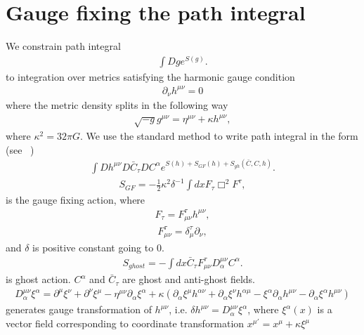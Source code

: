\documentclass[aps,preprintnumbers,superscriptaddress,longbibliography]{revtex4-1}
\begin{document}
\section{Gauge fixing the path integral}
\label{sec:gauge}
We constrain path integral
\begin{eqnarray}
\int{Dg e^{S(g)}}.
\end{eqnarray}
to integration over metrics satisfying the harmonic gauge condition
\begin{eqnarray}
\partial_{\nu}h^{\mu \nu}=0
\end{eqnarray}
where the metric density splits in the following way
\begin{eqnarray}
\sqrt{-g}g^{\mu \nu}=\eta^{\mu \nu}+\kappa h^{\mu \nu},
\end{eqnarray}
where $\kappa^2=32 \pi G$.
We use the standard method to write path integral in the form (see ~\cite{stelle1977renormalization})
\begin{eqnarray}
\int Dh^{\mu \nu} D\bar{C}_{\tau} DC^{\alpha} e^{{S(h)}+S_{GF}(h)+S_{gh}(\bar{C},C,h)}.   
\end{eqnarray}
\begin{eqnarray}
S_{GF}=-\frac{1}{2}\kappa^2\delta^{-1}\int dx F_{\tau} \Box^2 F^{\tau},    
\end{eqnarray}
is the gauge fixing action, where
\begin{eqnarray}
F_{\tau}=F^{\tau}_{\mu \nu}h^{\mu \nu},
\end{eqnarray}
\begin{eqnarray}
F^{\tau}_{\mu \nu}=\delta^{\tau}_{\mu} \partial_{\nu},  
\end{eqnarray}
and $\delta$ is positive constant going to $0$.
\begin{eqnarray}
S_{ghost}=-\int dx \bar{C}_{\tau} F^{\tau}_{\mu \nu} D^{\mu \nu}_{\alpha} C^{\alpha}.
\end{eqnarray}
is ghost action. $C^{\alpha}$ and $\bar{C}_{\tau}$ are ghost and anti-ghost fields.
\begin{eqnarray}
D^{\mu \nu}_{\alpha}\xi^\alpha=\partial^{\mu}\xi^{\nu}+\partial^{\nu}\xi^{\mu}-\eta^{\mu \nu}\partial_{\alpha}\xi^\alpha+\kappa(\partial_{\alpha}\xi^{\mu}h^{\alpha \nu}+\partial_{\alpha}\xi^{\nu}h^{\alpha \mu}-\xi^{\alpha}\partial_{\alpha}h^{\mu \nu}-\partial_{\alpha}\xi^{\alpha}h^{\mu \nu})
\end{eqnarray}
generates gauge transformation of $h^{\mu \nu}$, i.e. $\delta h^{\mu \nu}= D^{\mu \nu}_{\alpha}\xi^\alpha$, where $\xi^\alpha(x)$ is a vector field corresponding to coordinate transformation $x^{\mu'}=x^\mu+\kappa\xi^\mu$
\end{document}
